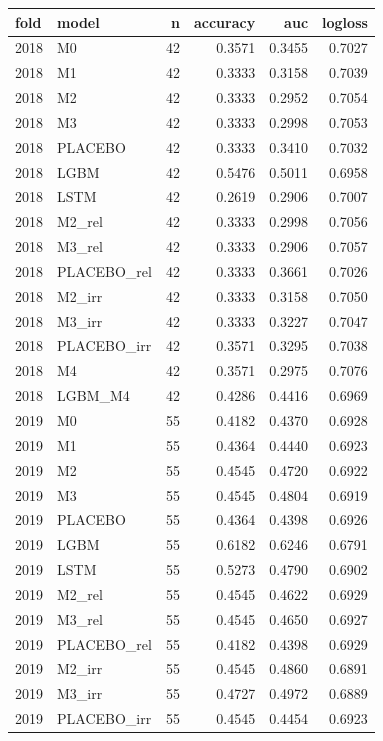 \begin{tabular}{llrrrr}
\toprule
fold & model & n & accuracy & auc & logloss \\
\midrule
2018 & M0 & 42 & 0.3571 & 0.3455 & 0.7027 \\
2018 & M1 & 42 & 0.3333 & 0.3158 & 0.7039 \\
2018 & M2 & 42 & 0.3333 & 0.2952 & 0.7054 \\
2018 & M3 & 42 & 0.3333 & 0.2998 & 0.7053 \\
2018 & PLACEBO & 42 & 0.3333 & 0.3410 & 0.7032 \\
2018 & LGBM & 42 & 0.5476 & 0.5011 & 0.6958 \\
2018 & LSTM & 42 & 0.2619 & 0.2906 & 0.7007 \\
2018 & M2\_rel & 42 & 0.3333 & 0.2998 & 0.7056 \\
2018 & M3\_rel & 42 & 0.3333 & 0.2906 & 0.7057 \\
2018 & PLACEBO\_rel & 42 & 0.3333 & 0.3661 & 0.7026 \\
2018 & M2\_irr & 42 & 0.3333 & 0.3158 & 0.7050 \\
2018 & M3\_irr & 42 & 0.3333 & 0.3227 & 0.7047 \\
2018 & PLACEBO\_irr & 42 & 0.3571 & 0.3295 & 0.7038 \\
2018 & M4 & 42 & 0.3571 & 0.2975 & 0.7076 \\
2018 & LGBM\_M4 & 42 & 0.4286 & 0.4416 & 0.6969 \\
2019 & M0 & 55 & 0.4182 & 0.4370 & 0.6928 \\
2019 & M1 & 55 & 0.4364 & 0.4440 & 0.6923 \\
2019 & M2 & 55 & 0.4545 & 0.4720 & 0.6922 \\
2019 & M3 & 55 & 0.4545 & 0.4804 & 0.6919 \\
2019 & PLACEBO & 55 & 0.4364 & 0.4398 & 0.6926 \\
2019 & LGBM & 55 & 0.6182 & 0.6246 & 0.6791 \\
2019 & LSTM & 55 & 0.5273 & 0.4790 & 0.6902 \\
2019 & M2\_rel & 55 & 0.4545 & 0.4622 & 0.6929 \\
2019 & M3\_rel & 55 & 0.4545 & 0.4650 & 0.6927 \\
2019 & PLACEBO\_rel & 55 & 0.4182 & 0.4398 & 0.6929 \\
2019 & M2\_irr & 55 & 0.4545 & 0.4860 & 0.6891 \\
2019 & M3\_irr & 55 & 0.4727 & 0.4972 & 0.6889 \\
2019 & PLACEBO\_irr & 55 & 0.4545 & 0.4454 & 0.6923 \\

\end{tabular}

